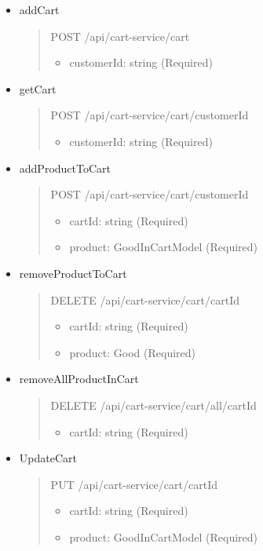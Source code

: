 \begin{itemize}
	\item addCart
	\begin{quote}
		POST /api/cart-service/cart
		\begin{itemize}
			\item customerId: string (Required)
		\end{itemize}
	\end{quote}

	\item getCart
	\begin{quote}
		POST /api/cart-service/cart/{customerId}
		\begin{itemize}
			\item customerId: string (Required)
		\end{itemize}
	\end{quote}

	\item addProductToCart
	\begin{quote}
		POST /api/cart-service/cart/{customerId}
		\begin{itemize}
			\item cartId: string (Required)
			\item product: GoodInCartModel (Required)
		\end{itemize}
	\end{quote}

	\item removeProductToCart
	\begin{quote}
		DELETE /api/cart-service/cart/{cartId}
		\begin{itemize}
			\item cartId: string (Required)
			\item product: Good (Required)
		\end{itemize}
	\end{quote}

	\item removeAllProductInCart
	\begin{quote}
		DELETE /api/cart-service/cart/all/{cartId}
		\begin{itemize}
			\item cartId: string (Required)
		\end{itemize}
	\end{quote}

	\item UpdateCart
	\begin{quote}
		PUT /api/cart-service/cart/{cartId}
		\begin{itemize}
			\item cartId: string (Required)
			\item product: GoodInCartModel (Required)
		\end{itemize}
	\end{quote}
\end{itemize}

